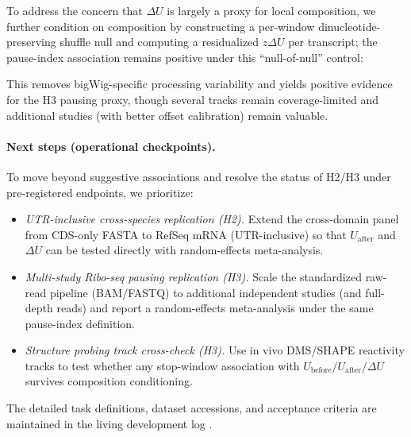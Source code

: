 
To address the concern that $\Delta U$ is largely a proxy for local composition, we further condition on composition by constructing a per-window dinucleotide-preserving shuffle null and computing a residualized $z\Delta U$ per transcript; the pause-index association remains positive under this ``null-of-null'' control:

This removes bigWig-specific processing variability and yields positive evidence for the H3 pausing proxy, though several tracks remain coverage-limited and additional studies (with better offset calibration) remain valuable.


\paragraph{Next steps (operational checkpoints).}
To move beyond suggestive associations and resolve the status of H2/H3 under pre-registered endpoints, we prioritize:
\begin{itemize}
\item \emph{UTR-inclusive cross-species replication (H2).} Extend the cross-domain panel from CDS-only FASTA to RefSeq mRNA (UTR-inclusive) so that $U_{\mathrm{after}}$ and $\Delta U$ can be tested directly with random-effects meta-analysis.
\item \emph{Multi-study Ribo-seq pausing replication (H3).} Scale the standardized raw-read pipeline (BAM/FASTQ) to additional independent studies (and full-depth reads) and report a random-effects meta-analysis under the same pause-index definition.
\item \emph{Structure probing track cross-check (H3).} Use in vivo DMS/SHAPE reactivity tracks to test whether any stop-window association with $U_{\mathrm{before}}/U_{\mathrm{after}}/\Delta U$ survives composition conditioning.
\end{itemize}
The detailed task definitions, dataset accessions, and acceptance criteria are maintained in the living development log .
